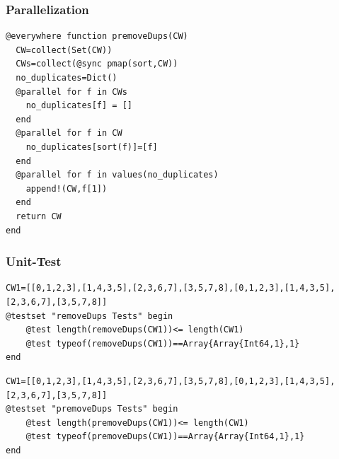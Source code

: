 \documentclass[a4paper,12pt]{article}
\begin{document}
\subsubsection{Parallelization}
\begin{Verbatim}[fontsize=\footnotesize]
@everywhere function premoveDups(CW)
  CW=collect(Set(CW))
  CWs=collect(@sync pmap(sort,CW))
  no_duplicates=Dict()
  @parallel for f in CWs
    no_duplicates[f] = []
  end
  @parallel for f in CW
    no_duplicates[sort(f)]=[f]
  end
  @parallel for f in values(no_duplicates)
    append!(CW,f[1])
  end
  return CW
end
\end{Verbatim}
\subsubsection{Unit-Test}
\begin{Verbatim}[fontsize=\footnotesize]
CW1=[[0,1,2,3],[1,4,3,5],[2,3,6,7],[3,5,7,8],[0,1,2,3],[1,4,3,5],[2,3,6,7],[3,5,7,8]]
@testset "removeDups Tests" begin
	@test length(removeDups(CW1))<= length(CW1)
	@test typeof(removeDups(CW1))==Array{Array{Int64,1},1}
end
\end{Verbatim}
\begin{Verbatim}[fontsize=\footnotesize]
CW1=[[0,1,2,3],[1,4,3,5],[2,3,6,7],[3,5,7,8],[0,1,2,3],[1,4,3,5],[2,3,6,7],[3,5,7,8]]
@testset "premoveDups Tests" begin
	@test length(premoveDups(CW1))<= length(CW1)
	@test typeof(premoveDups(CW1))==Array{Array{Int64,1},1}
end
\end{Verbatim}
\end{document}
